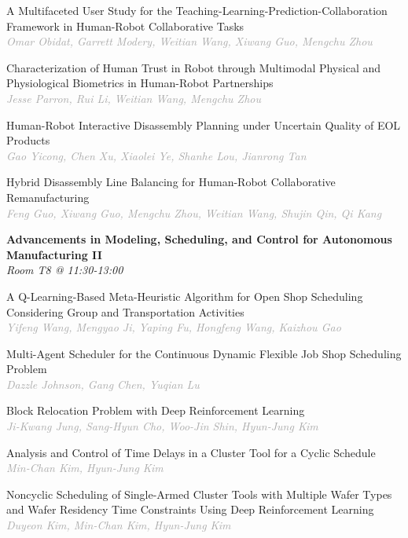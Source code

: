 \begin{multicols*}{2}
\small A Multifaceted User Study for the Teaching-Learning-Prediction-Collaboration Framework in Human-Robot Collaborative Tasks\\ 
\footnotesize \textcolor{darkgray}{\textit{Omar Obidat, Garrett  Modery, Weitian  Wang, Xiwang  Guo, Mengchu  Zhou}}

\small Characterization of Human Trust in Robot through Multimodal Physical and Physiological Biometrics in Human-Robot Partnerships\\ 
\footnotesize \textcolor{darkgray}{\textit{Jesse Parron, Rui  Li, Weitian  Wang, Mengchu  Zhou}}

\small Human-Robot Interactive Disassembly Planning under Uncertain Quality of EOL Products\\ 
\footnotesize \textcolor{darkgray}{\textit{Gao Yicong, Chen  Xu, Xiaolei  Ye, Shanhe  Lou, Jianrong  Tan}}

\small Hybrid Disassembly Line Balancing for Human-Robot Collaborative Remanufacturing\\ 
\footnotesize \textcolor{darkgray}{\textit{Feng Guo, Xiwang  Guo, Mengchu  Zhou, Weitian  Wang, Shujin  Qin, Qi  Kang}}

\normalsize \textbf{Advancements in Modeling, Scheduling, and Control for Autonomous Manufacturing II}\\
\small \textit{Room T8 @ 11:30-13:00}

\small A Q-Learning-Based Meta-Heuristic Algorithm for Open Shop Scheduling Considering Group and Transportation Activities\\ 
\footnotesize \textcolor{darkgray}{\textit{Yifeng Wang, Mengyao  Ji, Yaping  Fu, Hongfeng  Wang, Kaizhou  Gao}}

\small Multi-Agent Scheduler for the Continuous Dynamic Flexible Job Shop Scheduling Problem\\ 
\footnotesize \textcolor{darkgray}{\textit{Dazzle Johnson, Gang  Chen, Yuqian  Lu}}

\small Block Relocation Problem with Deep Reinforcement Learning\\ 
\footnotesize \textcolor{darkgray}{\textit{Ji-Kwang Jung, Sang-Hyun  Cho, Woo-Jin  Shin, Hyun-Jung  Kim}}

\small Analysis and Control of Time Delays in a Cluster Tool for a Cyclic Schedule\\ 
\footnotesize \textcolor{darkgray}{\textit{Min-Chan Kim, Hyun-Jung  Kim}}

\small Noncyclic Scheduling of Single-Armed Cluster Tools with Multiple Wafer Types and Wafer Residency Time Constraints Using Deep Reinforcement Learning\\ 
\footnotesize \textcolor{darkgray}{\textit{Duyeon Kim, Min-Chan  Kim, Hyun-Jung  Kim}}


\end{multicols*}
